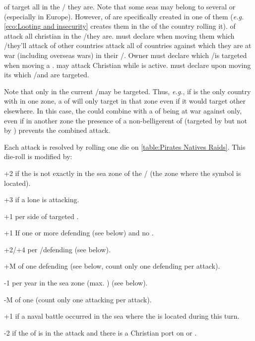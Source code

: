 \bparag \corsaire of  target all \TradeFLEET in the \STZ/\CTZ
they are.
\bparag Note that some seas may belong to several \STZ or \CTZ (especially in
Europe). However, \corsaire of  are specifically created in one
of them (\emph{e.g.} \ref{eco:Looting and insecurity} creates them in the \CTZ
of the country rolling it).
\bparag \corsaire of \Barbaresques attack all christian \TradeFLEET in the
\STZ/\CTZ they are. \TUR must declare when moving them which \STZ/\CTZ they'll
attack
\bparag \corsaire of other countries attack all \TradeFLEET of countries
against which they are at war (including overseas wars) in their
\STZ/\CTZ. Owner must declare which \STZ/\CTZ is targeted when moving a
\corsaire.
\bparag \TUR may attack Christian \TradeFLEET while
 is active. \TUR must declare upon moving its
\corsaire which \CTZ/\STZ and \TradeFLEET are targeted.

\begin{exemple}
  Note that only \TradeFLEET in the current \STZ/\CTZ may be targeted. Thus,
  \emph{e.g.}, if \VEN is the only country with \TradeFLEET in one zone, a
  \corsaire of \Barbaresques will only target \VEN in that zone even if it
  would target other \TradeFLEET elsewhere. In this case, the \corsaire could
  combine with a \corsaire of \TUR being at war against \VEN only, even if in
  another zone the presence of a non-belligerent \TradeFLEET of \FRA (targeted
  by \Barbaresques but not by \TUR) prevents the combined attack.
\end{exemple}

\bparag Each attack is resolved by rolling one die on \ref{table:Pirates
  Natives Raids}. This die-roll is modified by:
\begin{modlist}
\item[+2] if the \corsaire is not exactly in the sea zone of the \STZ/\CTZ
  (the zone where the symbol is located).
\item[+3] if a lone \corsaire\facemoins is attacking.
\item[+1] per side of targeted \TradeFLEET.
\item[+1] If one or more \ND defending (see below) and no \FLEET.
\item[+2/+4] per \FLEET\facemoins/\Faceplus defending (see below).
\item[+M] \Man of one defending \LeaderA (see below, count only one defending
  \LeaderA per attack).
\item[-1] per year in the sea zone (max. ) (see below).
\item[-M] \Man of one \corsaire \LeaderA (count only one attacking \LeaderA
  per attack). %
\item[+1] if a naval battle occurred in the sea where the \corsaire is located
  during this turn. %
\item[-2] if the \corsaire of  is in the attack and there is
  a Christian port on  or .
\end{modlist}


